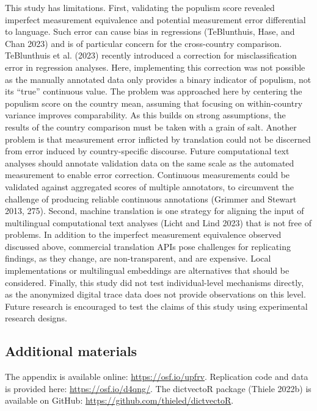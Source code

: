 \documentclass[
]{ccr}
\begin{document}
This study has limitations. First, validating the populism score
revealed imperfect measurement equivalence and potential measurement
error differential to language. Such error can cause bias in regressions
(TeBlunthuis, Hase, and Chan 2023) and is of particular concern for the
cross-country comparison. TeBlunthuis et al. (2023) recently introduced
a correction for misclassification error in regression analyses. Here,
implementing this correction was not possible as the manually annotated
data only provides a binary indicator of populism, not its ``true''
continuous value. The problem was approached here by centering the
populism score on the country mean, assuming that focusing on
within-country variance improves comparability. As this builds on strong
assumptions, the results of the country comparison must be taken with a
grain of salt. Another problem is that measurement error inflicted by
translation could not be discerned from error induced by
country-specific discourse. Future computational text analyses should
annotate validation data on the same scale as the automated measurement
to enable error correction. Continuous measurements could be validated
against aggregated scores of multiple annotators, to circumvent the
challenge of producing reliable continuous annotations (Grimmer and
Stewart 2013, 275). Second, machine translation is one strategy for
aligning the input of multilingual computational text analyses (Licht
and Lind 2023) that is not free of problems. In addition to the
imperfect measurement equivalence observed discussed above, commercial
translation APIs pose challenges for replicating findings, as they
change, are non-transparent, and are expensive. Local implementations or
multilingual embeddings are alternatives that should be considered.
Finally, this study did not test individual-level mechanisms directly,
as the anonymized digital trace data does not provide observations on
this level. Future research is encouraged to test the claims of this
study using experimental research designs.

\hypertarget{additional-materials}{%
\subsection{Additional materials}\label{additional-materials}}

The appendix is available online: \url{https://osf.io/upfrv}.
Replication code and data is provided here: \url{https://osf.io/d4qng/}.
The dictvectoR package (Thiele 2022b) is available on GitHub:
\url{https://github.com/thieled/dictvectoR}.
\end{document}
